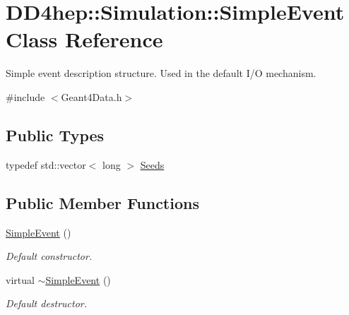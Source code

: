 \hypertarget{class_d_d4hep_1_1_simulation_1_1_simple_event}{
\section{DD4hep::Simulation::SimpleEvent Class Reference}
\label{class_d_d4hep_1_1_simulation_1_1_simple_event}
}


Simple event description structure. Used in the default I/O mechanism.  


{\ttfamily \#include $<$Geant4Data.h$>$}\subsection*{Public Types}
\begin{DoxyCompactItemize}
\item 
typedef std::vector$<$ long $>$ \hyperlink{class_d_d4hep_1_1_simulation_1_1_simple_event_a0a0e9b422036edb384b60a6f492eb8d4}{Seeds}
\end{DoxyCompactItemize}
\subsection*{Public Member Functions}
\begin{DoxyCompactItemize}
\item 
\hyperlink{class_d_d4hep_1_1_simulation_1_1_simple_event_a93eec2da5659fe2a6b03bda7362b0940}{SimpleEvent} ()
\begin{DoxyCompactList}\small\item\em Default constructor. \item\end{DoxyCompactList}\item 
virtual \hyperlink{class_d_d4hep_1_1_simulation_1_1_simple_event_a77e577dd4deef5466765196cc798c3b9}{$\sim$SimpleEvent} ()
\begin{DoxyCompactList}\small\item\em Default destructor. \item\end{DoxyCompactList}\end{DoxyCompactItemize}

